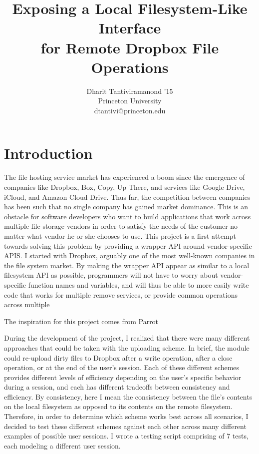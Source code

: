 \documentclass[pageno]{jpaper}
\begin{document}
\title{Exposing a Local Filesystem-Like Interface \\ for Remote Dropbox File Operations}
\author{Dharit Tantiviramanond '15\\ Princeton University \\ dtantivi@princeton.edu}

\date{}
\maketitle

\thispagestyle{empty}

\begin{abstract}
\end{abstract}

\section{Introduction}
\label{sec:intro}
The file hosting service market has experienced a boom since the emergence of companies like Dropbox, Box, Copy, Up There, and services like Google Drive, iCloud, and Amazon Cloud Drive. Thus far, the competition between companies has been such that no single company has gained market dominance. This is an obstacle for software developers who want to build applications that work across multiple file storage vendors in order to satisfy the needs of the customer no matter what vendor he or she chooses to use. This project is a first attempt towards solving this problem by providing a wrapper API around vendor-specific APIS. I started with Dropbox, arguably one of the most well-known companies in the file system market. By making the wrapper API appear as similar to a local filesystem API as possible, programmers will not have to worry about vendor-specific function names and variables, and will thus be able to more easily write code that works for multiple remove services, or provide common operations across multiple 

The inspiration for this project comes from Parrot

During the development of the project, I realized that there were many different approaches that could be taken with the uploading scheme. In brief, the module could re-upload dirty files to Dropbox after a write operation, after a close operation, or at the end of the user's session. Each of these different schemes provides different levels of efficiency depending on the user's specific behavior during a session, and each has different tradeoffs between consistency and efficiency. By consistency, here I mean the consistency between the file's contents on the local filesystem as opposed to its contents on the remote filesystem. Therefore, in order to determine which scheme works best across all scenarios, I decided to test these different schemes against each other across many different examples of possible user sessions. I wrote a testing script comprising of 7 tests, each modeling a different user session. 
\end{document}
